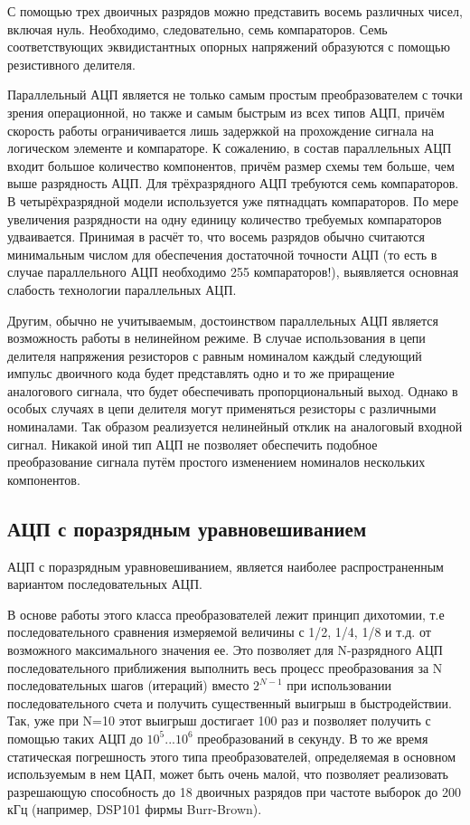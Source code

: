 \documentclass[unicode, 12pt, a4paper, oneside]{article}
\begin{document}
С помощью трех двоичных разрядов можно представить восемь различных чисел, включая нуль. Необходимо, следовательно, семь компараторов. Семь соответствующих эквидистантных опорных напряжений образуются с помощью резистивного делителя.

Параллельный АЦП является не только самым простым преобразователем с точки зрения операционной, но также и самым быстрым из всех типов АЦП, причём скорость работы ограничивается лишь задержкой на прохождение сигнала на логическом элементе и компараторе. К сожалению, в состав параллельных АЦП входит большое количество компонентов, причём размер схемы тем больше, чем выше разрядность АЦП. Для трёхразрядного АЦП требуются семь компараторов. В четырёхразрядной модели используется уже пятнадцать компараторов. По мере увеличения разрядности на одну единицу количество требуемых компараторов удваивается. Принимая в расчёт то, что восемь разрядов обычно считаются минимальным числом для обеспечения достаточной точности АЦП (то есть в случае параллельного АЦП необходимо 255 компараторов!), выявляется основная слабость технологии параллельных АЦП.

Другим, обычно не учитываемым, достоинством параллельных АЦП является возможность работы в нелинейном режиме. В случае использования в цепи делителя напряжения резисторов с равным номиналом каждый следующий импульс двоичного кода будет представлять одно и то же приращение аналогового сигнала, что будет обеспечивать пропорциональный выход. Однако в особых случаях в цепи делителя могут применяться резисторы с различными номиналами. Так образом реализуется нелинейный отклик на аналоговый входной сигнал. Никакой иной тип АЦП не позволяет обеспечить подобное преобразование сигнала путём простого изменением номиналов нескольких компонентов.

\subsection*{АЦП с поразрядным уравновешиванием}

АЦП с поразрядным уравновешиванием, является наиболее распространенным вариантом последовательных АЦП.

В основе работы этого класса преобразователей лежит принцип дихотомии, т.е последовательного сравнения измеряемой величины с 1/2, 1/4, 1/8 и т.д. от возможного максимального значения ее. Это позволяет для N-разрядного АЦП последовательного приближения выполнить весь процесс преобразования за N последовательных шагов (итераций) вместо $2^{N-1}$ при использовании последовательного счета и получить существенный выигрыш в быстродействии. Так, уже при N=10 этот выигрыш достигает 100 раз и позволяет получить с помощью таких АЦП до $10^5$...$10^6$ преобразований в секунду. В то же время статическая погрешность этого типа преобразователей, определяемая в основном используемым в нем ЦАП, может быть очень малой, что позволяет реализовать разрешающую способность до 18 двоичных разрядов при частоте выборок до 200 кГц (например, DSP101 фирмы Burr-Brown).
\end{document}

